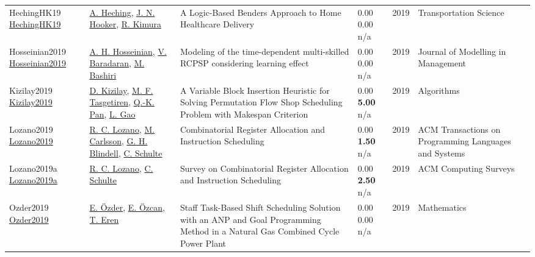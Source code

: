 {\begin{longtable}{p{3cm}p{5cm}p{10cm}p{1cm}rp{2.5cm}l}
HechingHK19 \href{http://dx.doi.org/10.1287/trsc.2018.0830}{HechingHK19} & \hyperref[auth:a1021]{A. Heching}, \hyperref[auth:a160]{J. N. Hooker}, \hyperref[auth:a1022]{R. Kimura} & \cellcolor{gold!20}A Logic-Based Benders Approach to Home Healthcare Delivery & \noindent{}\textcolor{black!50}{0.00} \textcolor{black!50}{0.00} n/a & 2019 & \cellcolor{red!20}Transportation Science & \cite{HechingHK19}\\
Hosseinian2019 \href{http://dx.doi.org/10.1108/jm2-07-2018-0098}{Hosseinian2019} & \hyperref[auth:a1573]{A. H. Hosseinian}, \hyperref[auth:a1574]{V. Baradaran}, \hyperref[auth:a1575]{M. Bashiri} & Modeling of the time-dependent multi-skilled RCPSP considering learning effect & \noindent{}\textcolor{black!50}{0.00} \textcolor{black!50}{0.00} n/a & 2019 & Journal of Modelling in Management & \cite{Hosseinian2019}\\
Kizilay2019 \href{http://dx.doi.org/10.3390/a12050100}{Kizilay2019} & \hyperref[auth:a1380]{D. Kizilay}, \hyperref[auth:a1973]{M. F. Tasgetiren}, \hyperref[auth:a1974]{Q.-K. Pan}, \hyperref[auth:a1975]{L. Gao} & \cellcolor{gold!20}A Variable Block Insertion Heuristic for Solving Permutation Flow Shop Scheduling Problem with Makespan Criterion & \noindent{}\textcolor{black!50}{0.00} \textbf{5.00} n/a & 2019 & Algorithms & \cite{Kizilay2019}\\
Lozano2019 \href{http://dx.doi.org/10.1145/3332373}{Lozano2019} & \hyperref[auth:a1522]{R. C. Lozano}, \hyperref[auth:a91]{M. Carlsson}, \hyperref[auth:a1523]{G. H. Blindell}, \hyperref[auth:a92]{C. Schulte} & \cellcolor{green!10}Combinatorial Register Allocation and Instruction Scheduling & \noindent{}\textcolor{black!50}{0.00} \textbf{1.50} n/a & 2019 & ACM Transactions on Programming Languages and Systems & \cite{Lozano2019}\\
Lozano2019a \href{http://dx.doi.org/10.1145/3200920}{Lozano2019a} & \hyperref[auth:a1522]{R. C. Lozano}, \hyperref[auth:a92]{C. Schulte} & \cellcolor{green!10}Survey on Combinatorial Register Allocation and Instruction Scheduling & \noindent{}\textcolor{black!50}{0.00} \textbf{2.50} n/a & 2019 & ACM Computing Surveys & \cite{Lozano2019a}\\
Ozder2019 \href{http://dx.doi.org/10.3390/math7020192}{Ozder2019} & \hyperref[auth:a1753]{E. Özder}, \hyperref[auth:a1754]{E. Özcan}, \hyperref[auth:a415]{T. Eren} & \cellcolor{gold!20}Staff Task-Based Shift Scheduling Solution with an ANP and Goal Programming Method in a Natural Gas Combined Cycle Power Plant & \noindent{}\textcolor{black!50}{0.00} \textcolor{black!50}{0.00} n/a & 2019 & Mathematics & \cite{Ozder2019}\\

\end{longtable}}
